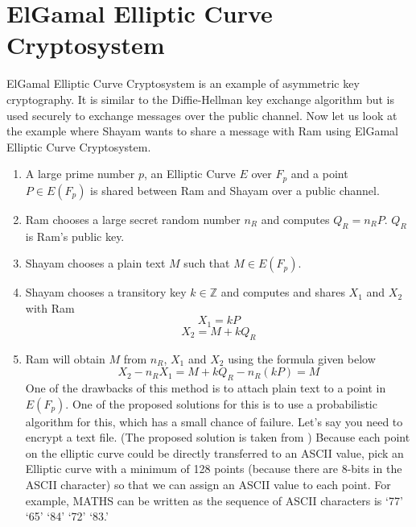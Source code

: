 \documentclass[a4paper,12pt]{report}
\begin{document}
\section{ElGamal Elliptic Curve Cryptosystem}
ElGamal Elliptic Curve Cryptosystem is an example of asymmetric key cryptography. It is similar to the Diffie-Hellman key exchange algorithm but is used securely to exchange messages over the public channel. Now let us look at the example where Shayam wants to share a message with Ram using ElGamal Elliptic Curve Cryptosystem.
\begin{enumerate}
\item A large prime number $p$, an Elliptic Curve $E$ over $F_p$ and a point $P \in E(F_p)$  is shared between Ram and Shayam over a public channel.
 \item Ram chooses a large secret random number $n_R$ and computes $Q_R = n_R P$. $Q_R$ is Ram’s public key.  
 \item Shayam chooses a plain text $M$ such that $M \in E(F_p)$.
 \item Shayam chooses a transitory key $k\in \mathbb{Z}$ and computes and shares $X_1$ and $X_2$ with Ram
 $$X_1 = k P$$
 $$X_2 = M+k Q_R$$
 \item Ram will obtain $M$ from $n_R$, $X_1$ and $X_2$ using the formula given below
 $$X_2-n_R X_1=M+k Q_R- n_R (k P)=M$$
 One of the drawbacks of this method is to attach plain text to a point in $ E(F_p)$. One of the proposed solutions for this is to use a probabilistic algorithm for this, which has a small chance of failure. Let’s say you need to encrypt a text file. (The proposed solution is taken from \cite{7033751}) Because each point on the elliptic curve could be directly transferred to an ASCII value, pick an Elliptic curve with a minimum of 128 points (because there are 8-bits in the ASCII character) so that we can assign an ASCII value to each point. For example, MATHS can be written as
the sequence of ASCII characters is ‘77’ ‘65’ ‘84’ ‘72’ ‘83.’
\end{enumerate}
\cleardoublepage
\end{document}
